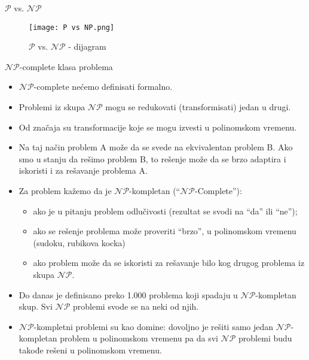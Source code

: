 \documentclass[aspectratio=169, xcolor=table, 10pt]{beamer}
\theoremstyle{definition}
\begin{document}
\begin{frame}{$\mathcal{P}$ vs. $\mathcal{NP}$}
    \begin{figure}[ht]
        \centering
        \texttt{[image: P vs NP.png]}
        \caption{$\mathcal{P}$ vs. $\mathcal{NP}$ - dijagram}
    \end{figure}
\end{frame}

\begin{frame}{$\mathcal{NP}$-complete klasa problema}

\begin{itemize}

\item $\mathcal{NP}\text{-complete}$ ne\' cemo definisati formalno.
\item Problemi iz skupa $\mathcal{NP}$ mogu se redukovati (transformisati) jedan u drugi. 

\item Od značaja su transformacije koje se mogu izvesti u polinomskom vremenu.

\item Na taj način problem A može da se svede na ekvivalentan problem B.  Ako smo u stanju da rešimo problem B, to rešenje može da se brzo adaptira i iskoristi i za rešavanje problema A.

\item Za problem kažemo da je $\mathcal{NP}$-kompletan (“$\mathcal{NP}$-Complete”):
\begin{itemize}
\item ako je u pitanju problem odlučivosti (rezultat se svodi na “da” ili “ne”);

\item ako se rešenje problema može proveriti “brzo”, u polinomskom vremenu (sudoku, rubikova kocka)

\item ako problem može da se iskoristi za rešavanje bilo kog drugog problema iz skupa $\mathcal{NP}$.
\end{itemize}

\item Do danas je definisano preko 1.000 problema koji spadaju u $\mathcal{NP}$-kompletan skup. Svi $\mathcal{NP}$ problemi svode se na neki od njih.

\item $\mathcal{NP}$-kompletni problemi su kao domine: dovoljno je rešiti samo jedan $\mathcal{NP}$-kompletan problem u polinomskom vremenu pa da svi $\mathcal{NP}$ problemi budu takođe rešeni u polinomskom vremenu.
\end{itemize}

\end{frame}
\end{document}
